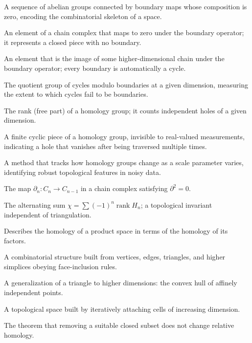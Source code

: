 \begin{description}[leftmargin=*,style=nextline,itemsep=0.3em]
\item[\textbf{Chain complex.}] A sequence of abelian groups connected by boundary maps whose composition is zero, encoding the combinatorial skeleton of a space.
\item[\textbf{Cycle.}] An element of a chain complex that maps to zero under the boundary operator; it represents a closed piece with no boundary.
\item[\textbf{Boundary.}] An element that is the image of some higher-dimensional chain under the boundary operator; every boundary is automatically a cycle.
\item[\textbf{Homology group.}] The quotient group of cycles modulo boundaries at a given dimension, measuring the extent to which cycles fail to be boundaries.
\item[\textbf{Betti number.}] The rank (free part) of a homology group; it counts independent holes of a given dimension.
\item[\textbf{Torsion.}] A finite cyclic piece of a homology group, invisible to real-valued measurements, indicating a hole that vanishes after being traversed multiple times.
\item[\textbf{Persistent homology.}] A method that tracks how homology groups change as a scale parameter varies, identifying robust topological features in noisy data.
\item[\textbf{Boundary operator.}] The map $\partial_n\colon C_n\to C_{n-1}$ in a chain complex satisfying $\partial^2=0$.
\item[\textbf{Euler characteristic.}] The alternating sum $\chi=\sum(-1)^n\operatorname{rank}H_n$; a topological invariant independent of triangulation.
\item[\textbf{Künneth theorem.}] Describes the homology of a product space in terms of the homology of its factors.
\item[\textbf{Simplicial complex.}] A combinatorial structure built from vertices, edges, triangles, and higher simplices obeying face-inclusion rules.
\item[\textbf{Simplex.}] A generalization of a triangle to higher dimensions: the convex hull of affinely independent points.
\item[\textbf{CW complex.}] A topological space built by iteratively attaching cells of increasing dimension.
\item[\textbf{Excision.}] The theorem that removing a suitable closed subset does not change relative homology.
\end{description}
